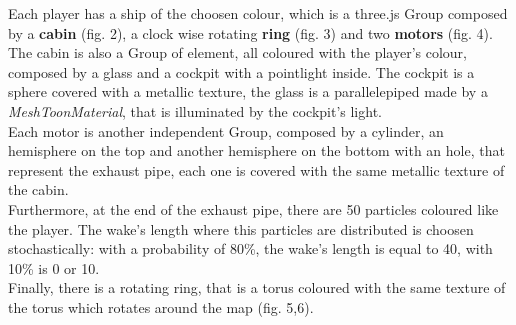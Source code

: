 \documentclass[11pt]{article}
\begin{document}
	
	Each player has a ship of the choosen colour, which is a three.js Group composed by a \textbf{cabin} (fig. 2), a clock wise rotating \textbf{ring} (fig. 3) and two \textbf{motors} (fig. 4).\\
	
	The cabin is also a Group of element, all coloured with the player's colour, composed by a glass and a cockpit with a pointlight inside.
	The cockpit is a sphere covered with a metallic texture, the glass is a parallelepiped made by a \textit{MeshToonMaterial}, that is illuminated by the cockpit's light.\\
	
	Each motor is another independent Group, composed by a cylinder, an hemisphere on the top and another hemisphere on the bottom with an hole, that represent the exhaust pipe, each one is covered with the same metallic texture of the cabin.\\
	Furthermore, at the end of the exhaust pipe, there are 50 particles coloured like the player. The wake's length where this particles are distributed is choosen stochastically: with a probability of 80\%, the wake's length is equal to 40, with 10\% is 0 or 10.\\
	
	Finally, there is a rotating ring, that is a torus coloured with the same texture of the torus which rotates around the map (fig. 5,6).
	
\end{document}
